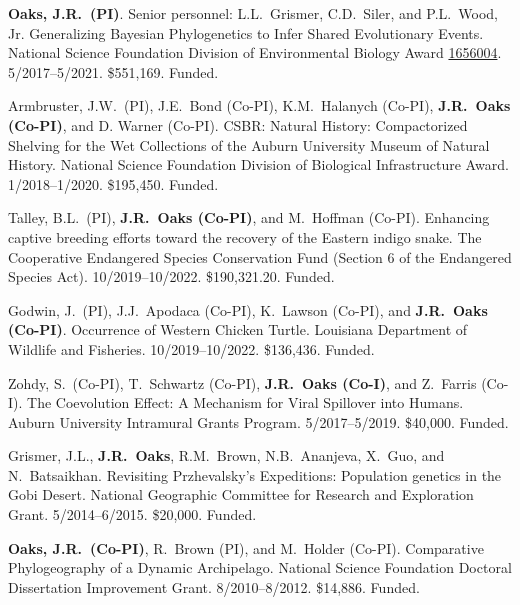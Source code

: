 \myHangIndent
\textbf{Oaks, J.R.\ (PI)}.
Senior personnel: L.L.\ Grismer, C.D.\ Siler, and P.L.\ Wood, Jr.
Generalizing Bayesian Phylogenetics to Infer Shared Evolutionary Events.
National Science Foundation Division of Environmental Biology Award
\href{https://www.nsf.gov/awardsearch/showAward?AWD_ID=1656004&HistoricalAwards=false}{1656004}.
5/2017--5/2021.
\$551,169.
Funded.

\myHangIndent
Armbruster, J.W.\ (PI),
J.E.\ Bond (Co-PI),
K.M.\ Halanych (Co-PI),
\textbf{J.R.\ Oaks (Co-PI)},
and
D. Warner (Co-PI).
CSBR: Natural History: Compactorized Shelving for the Wet Collections of the
Auburn University Museum of Natural History.
National Science Foundation Division of Biological Infrastructure Award.
1/2018--1/2020.
\$195,450.
Funded.


\myHangIndent
Talley, B.L.\ (PI),
\textbf{J.R.\ Oaks (Co-PI)},
and
M.\ Hoffman (Co-PI).
Enhancing captive breeding efforts toward the recovery of the Eastern indigo snake.
The Cooperative Endangered Species Conservation Fund (Section 6 of the
Endangered Species Act).
10/2019--10/2022.
\$190,321.20.
Funded.

\myHangIndent
Godwin, J.\ (PI),
J.J.\ Apodaca (Co-PI),
K.\ Lawson (Co-PI),
and
\textbf{J.R.\ Oaks (Co-PI)}.
Occurrence of Western Chicken Turtle.
Louisiana Department of Wildlife and Fisheries.
10/2019--10/2022.
\$136,436.
Funded.

\myHangIndent
Zohdy, S.\ (Co-PI), T.\ Schwartz (Co-PI), \textbf{J.R.\ Oaks (Co-I)}, and Z.\ Farris (Co-I).
The Coevolution Effect: A Mechanism for Viral Spillover into Humans.
Auburn University Intramural Grants Program.
5/2017--5/2019.
\$40,000.
Funded.

\myHangIndent
Grismer, J.L., \textbf{J.R.\ Oaks}, R.M.\ Brown, N.B.\ Ananjeva, X.\ Guo, and N.\
Batsaikhan.
Revisiting Przhevalsky's Expeditions: Population genetics in the Gobi Desert.
National Geographic Committee for Research and Exploration Grant.
5/2014--6/2015.
\$20,000.
Funded.

\myHangIndent
\textbf{Oaks, J.R.\ (Co-PI)}, R.\ Brown (PI), and M.\ Holder (Co-PI).
Comparative Phylogeography of a Dynamic Archipelago.
National Science Foundation Doctoral Dissertation Improvement Grant.
8/2010--8/2012.
\$14,886.
Funded.

